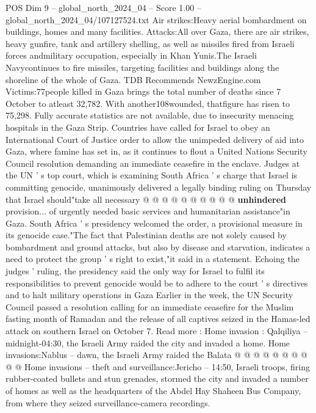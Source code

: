 \begin{textsample}{POS Dim 9 – global\_north\_2024\_04 – Score 1.00 – global\_north\_2024\_04/107127524.txt}  \label{ex:f9_pos_239}
Air strikes:Heavy aerial bombardment on buildings, homes and many facilities.
Attacks:All over Gaza, there are air strikes, heavy gunfire, tank and artillery shelling, as well as missiles fired from Israeli forces andmilitary occupation, especially in Khan Yunis.The Israeli Navycontinues to fire missiles, targeting facilities and buildings along the shoreline of the whole of Gaza.
TDB Recommends NewzEngine.com Victims:77people killed in Gaza brings the total number of deaths since 7 October to atleast 32,782.
With another108wounded, thatfigure has risen to 75,298.
Fully accurate statistics are not available, due to insecurity menacing hospitals in the Gaza Strip.
Countries have called for Israel to obey an International Court of Justice order to allow the unimpeded delivery of aid into Gaza, where famine has set in, as it continues to flout a United Nations Security Council resolution demanding an immediate ceasefire in the enclave.
Judges at the UN ' s top court, which is examining South Africa ' s charge that Israel is committing genocide, unanimously delivered a legally binding ruling on Thursday that Israel should"take all necessary @ @ @ @ @ @ @ @ @ @ \textbf{unhindered} provision... of urgently needed basic services and humanitarian assistance"in Gaza.
South Africa ' s presidency welcomed the order, a provisional measure in its genocide case."The fact that Palestinian deaths are not solely caused by bombardment and ground attacks, but also by disease and starvation, indicates a need to protect the group ' s right to exist,"it said in a statement.
Echoing the judges ' ruling, the presidency said the only way for Israel to fulfil its responsibilities to prevent genocide would be to adhere to the court ' s directives and to halt military operations in Gaza Earlier in the week, the UN Security Council passed a resolution calling for an immediate ceasefire for the Muslim fasting month of Ramadan and the release of all captives seized in the Hamas-led attack on southern Israel on October 7.
Read more : Home invasion : Qalqiliya -- midnight-04:30, the Israeli Army raided the city and invaded a home.
Home invasions:Nablus -- dawn, the Israeli Army raided the Balata @ @ @ @ @ @ @ @ @ @ Home invasions -- theft and surveillance:Jericho -- 14:50, Israeli troops, firing rubber-coated bullets and stun grenades, stormed the city and invaded a number of homes as well as the headquarters of the Abdel Hay Shaheen Bus Company, from where they seized surveillance-camera recordings.

\end{textsample}
